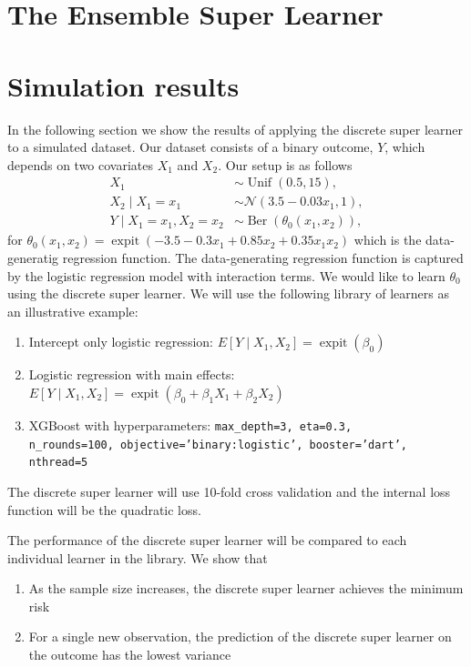 \documentclass[11pt, a4paper]{article}
\theoremstyle{definition}
\theoremstyle{remark}
\DeclareMathOperator{\expit}{expit}
\begin{document}
\section{The Ensemble Super Learner}
\section{Simulation results}
In the following section we show the results of applying the discrete super learner to a simulated dataset. Our dataset consists of a binary outcome, $Y$, which depends on two covariates $X_1$ and $X_2$. Our setup is as follows
\begin{align*}
    X_1 &\sim \operatorname{Unif}(0.5, 15),\\
    X_2 \mid X_1 = x_1 &\sim \mathcal{N}(3.5-0.03x_1, 1),\\
    Y \mid X_1 = x_1, X_2 = x_2 &\sim \operatorname{Ber}(\theta_0(x_1, x_2)),
\end{align*}
for $\theta_0(x_1, x_2) = \expit({-3.5 - 0.3x_1 + 0.85x_2 + 0.35x_1x_2})$ which is the data-generatig regression function. The data-generating regression function is captured by the logistic regression model with interaction terms. We would like to learn $ \theta_0 $ using the discrete super learner. We will use the following library of learners as an illustrative example:
\begin{enumerate}
    \item Intercept only logistic regression: $E[Y \mid X_1, X_2] = \expit(\beta_0)$
    \item Logistic regression with main effects: $E[Y \mid X_1, X_2] = \expit(\beta_0 + \beta_1 X_1 + \beta_2 X_2)$
    \item XGBoost with hyperparameters: \texttt{max\_depth=3, eta=0.3,\\ n\_rounds=100, objective='binary:logistic', booster='dart', nthread=5}
\end{enumerate}
The discrete super learner will use 10-fold cross validation and the internal loss function will be the quadratic loss. 

The performance of the discrete super learner will be compared to each individual learner in the library. We show that
\begin{enumerate}
    \item As the sample size increases, the  discrete super learner achieves the minimum risk 
    \item For a single new observation, the prediction of the discrete super learner on the outcome has the lowest variance
\end{enumerate}
\end{document}
